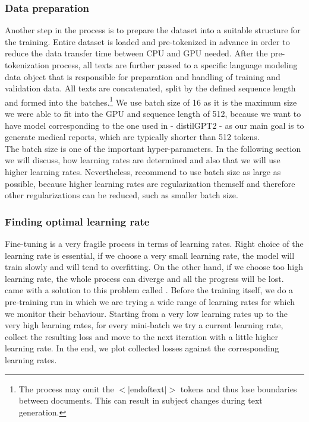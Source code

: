 \subsubsection*{Data preparation}
Another step in the process is to prepare the dataset into a suitable structure for the training. Entire dataset is loaded and pre-tokenized in advance in order to reduce the data transfer time between CPU and GPU needed. After the pre-tokenization process, all texts are further passed to a specific language modeling data object that is responsible for preparation and handling of training and validation data. All texts are concatenated, split by the defined sequence length and formed into the batches.\footnote[9]{The process may omit the $<|$endoftext$|>$ tokens and thus lose boundaries between documents. This can result in subject changes during text generation.} We use batch size of 16 as it is the maximum size we were able to fit into the GPU and sequence length of 512, because we want to have model corresponding to the one used in \citet{alfarghaly2021automated} - distilGPT2 - as our main goal is to generate medical reports, which are typically shorter than 512 tokens.\\

The batch size is one of the important hyper-parameters. In the following section we will discuss, how learning rates are determined and also that we will use higher learning rates. Nevertheless, \citet{smith2018disciplined} recommend to use batch size as large as possible, because higher learning rates are regularization themself and therefore other regularizations can be reduced, such as smaller batch size.

\subsubsection*{Finding optimal learning rate}
Fine-tuning is a very fragile process in terms of learning rates. Right choice of the learning rate is essential, if we choose a very small learning rate, the model will train slowly and will tend to overfitting. On the other hand, if we choose too high learning rate, the whole process can diverge and all the progress will be lost.\\

\citet{smith2017cyclical} came with a solution to this problem called . Before the training itself, we do a pre-training run in which we are trying a wide range of learning rates for which we monitor their behaviour. Starting from a very low learning rates up to the very high learning rates, for every mini-batch we try a current learning rate, collect the resulting loss and move to the next iteration with a little higher learning rate. In the end, we plot collected losses against the corresponding learning rates.\\

